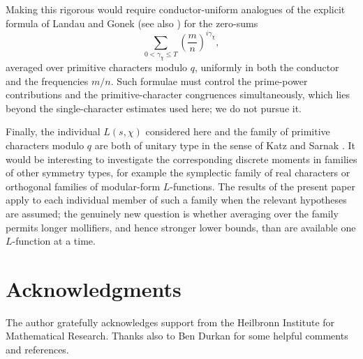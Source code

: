 \documentclass[10pt,a4paper]{amsart}
\numberwithin{equation}{section}
\begin{document}
Making this rigorous would require conductor-uniform analogues of the explicit formula of Landau \cite{Landau} and Gonek \cite{GonekLandau,GonekMean} (see also \cite{DHPC}) for the zero-sums
\[
\sum_{0<\gamma_\chi\le T}\left(\frac{m}{n}\right)^{i\gamma_\chi},
\]
averaged over primitive characters modulo $q$, uniformly in both the conductor and the frequencies $m/n$. Such formulae must control the prime-power contributions and the primitive-character congruences simultaneously, which lies beyond the single-character estimates used here; we do not pursue it.

Finally, the individual $L(s,\chi)$ considered here and the family of primitive characters modulo $q$ are both of unitary type in the sense of Katz and Sarnak \cite{KatzSarnak}. It would be interesting to investigate the corresponding discrete moments in families of other symmetry types, for example the symplectic family of real characters or orthogonal families of modular-form $L$-functions. The results of the present paper apply to each individual member of such a family when the relevant hypotheses are assumed; the genuinely new question is whether averaging over the family permits longer mollifiers, and hence stronger lower bounds, than are available one $L$-function at a time.

\section*{Acknowledgments}
The author gratefully acknowledges support from the Heilbronn Institute for Mathematical Research. Thanks also to Ben Durkan for some helpful comments and references.
\end{document}
